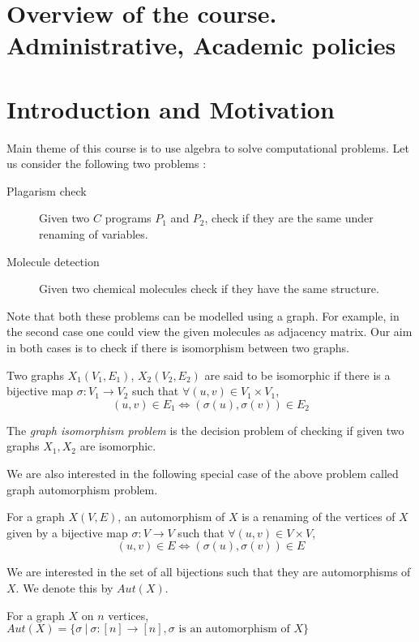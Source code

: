 
\section{Overview of the course. Administrative, Academic policies}
\newpage

\section{Introduction and Motivation}
Main theme of this course is to use algebra to solve computational problems.
Let us consider the following two problems :
\begin{description}
	\item [Plagarism check]
	Given two $C$ programs $P_1$ and $P_2$, check if they are the same
	under renaming of variables.
	\item [Molecule detection]
	Given two chemical molecules check if they have the same structure.
\end{description}

Note that both these problems can be modelled using a graph. For example, in
the second case one could view the given molecules as adjacency matrix.
Our aim in both cases is to check if there is isomorphism
between two graphs.

\begin{definition}
	Two graphs $X_1(V_1,E_1)$, $X_2(V_2,E_2)$ are said to be isomorphic if
	there is a bijective map $\sigma:V_1 \to V_2$ such that $\forall
	(u,v) \in V_1 \times V_1$, \[(u,v) \in E_1 \iff (\sigma(u), \sigma(v))
	\in E_2 \]
\end{definition}
\begin{problem}
	The \emph{graph isomorphism problem} is the decision problem of
	checking if given two graphs $X_1, X_2$ are isomorphic.
\end{problem}

We are also interested in the following special case of the above problem
called graph automorphism problem. 

\begin{definition}
	For a graph $X(V,E)$, an automorphism of $X$ is a renaming of the
	vertices of $X$ given by a bijective map $\sigma:V \to V$ such 
	that $\forall
	(u,v) \in V \times V$, \[(u,v) \in E \iff (\sigma(u), \sigma(v))
	\in E \]
\end{definition}
We are interested in the set of all bijections such that they are
automorphisms of $X$. We denote this by $Aut(X)$.
\begin{definition}
	For a graph $X$ on $n$ vertices, 
	$Aut(X) = \{ \sigma ~|~ \sigma :[n] \to [n], \sigma \text{ is an
	automorphism of }X \}$
\end{definition}

